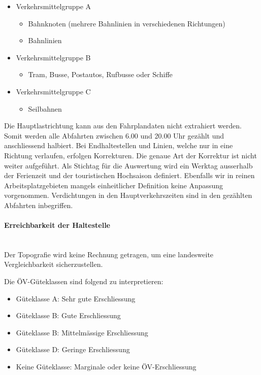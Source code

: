 \begin{itemize}[noitemsep]
    \item Verkehrsmittelgruppe A
    \begin{itemize}
        \item Bahnknoten (mehrere Bahnlinien in verschiedenen Richtungen)
        \item Bahnlinien
    \end{itemize}
    \item Verkehrsmittelgruppe B
    \begin{itemize}
        \item Tram, Busse, Postautos, Rufbusse oder Schiffe
    \end{itemize}
    \item Verkehrsmittelgruppe C
    \begin{itemize}
        \item Seilbahnen
    \end{itemize}
\end{itemize}

Die Hauptlastrichtung kann aus den Fahrplandaten nicht extrahiert werden.
Somit werden alle Abfahrten zwischen 6.00 und 20.00 Uhr gezählt und anschliessend halbiert. Bei Endhaltestellen und Linien, welche nur in eine Richtung verlaufen, erfolgen Korrekturen.
Die genaue Art der Korrektur ist nicht weiter aufgeführt.
Als Stichtag für die Auswertung wird ein Werktag ausserhalb der Ferienzeit und der touristischen Hochsaison definiert.
Ebenfalls wir in reinen Arbeitsplatzgebieten mangels einheitlicher Definition keine Anpassung vorgenommen.
Verdichtungen in den Hauptverkehrszeiten sind in den gezählten Abfahrten inbegriffen.

\paragraph{Erreichbarkeit der Haltestelle}~\\
\label{Berechnungsmethodik ARE:Erreichbarkeit der Haltestelle}
Der Topografie wird keine Rechnung getragen, um eine landesweite Vergleichbarkeit sicherzustellen.

Die \acs{ÖV}-Güteklassen sind folgend zu interpretieren:

\begin{itemize}[noitemsep]
    \item Güteklasse A: Sehr gute Erschliessung
    \item Güteklasse B: Gute Erschliessung
    \item Güteklasse B: Mittelmässige Erschliessung
    \item Güteklasse D: Geringe Erschliessung
    \item Keine Güteklasse: Marginale oder keine \acs{ÖV}-Erschliessung
\end{itemize}

